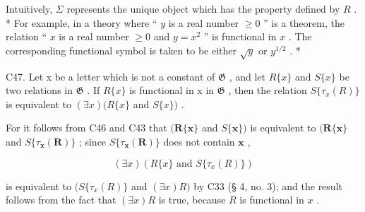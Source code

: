 Intuitively, \(\Sigma\) represents the unique object which has the property defined by \(R\) . * For example, in a theory where `` \(y\) is a real number \(\geqslant 0\) '' is a theorem, the relation `` \(x\) is a real number \(\geqslant 0\) and \(y = x^{2}\) '' is functional in \(x\) . The corresponding functional symbol is taken to be either \(\sqrt{y}\) or \(y^{1/2}\) . *

C47. Let x be a letter which is not a constant of \(\mathfrak{G}\) , and let \(R\{x\}\) and \(S\{x\}\) be two relations in \(\mathfrak{G}\) . If \(R\{x\}\) is functional in x in \(\mathfrak{G}\) , then the relation \(S\{\tau_{x}(R)\}\) is equivalent to \((\exists x)(R\{x\}\) and \(S\{x\})\) .

For it follows from C46 and C43 that \((\pmb{R}\{\pmb{x}\}\) and \(S\{\pmb{x}\})\) is equivalent to \((\pmb{R}\{\pmb{x}\}\) and \(S\{\tau_{\pmb{x}}(\pmb{R})\}\) ; since \(S\{\tau_{\pmb{x}}(\pmb{R})\}\) does not contain \(\pmb{x}\) ,

\[
(\exists x) (R \{x \} \text {   and   } S \{\tau_ {x} (R) \})
\]

is equivalent to \((S\{\tau_x(R)\}\) and \((\exists x)R)\) by C33 (§ 4, no. 3); and the result follows from the fact that \((\exists x)R\) is true, because \(R\) is functional in \(x\) .

\clearpage
